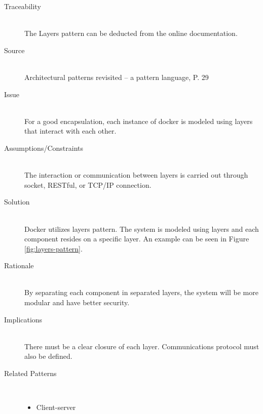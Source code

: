 \begin{description}
\item [Traceability]~\\
The Layers pattern can be deducted from the online documentation\cite{dockerarchi}.

\item [Source]~\\
Architectural patterns revisited -- a pattern language, P. 29 \cite{avgeriou2005architectural}

\item [Issue]~\\
For a good encapsulation, each instance of docker is modeled using layers that interact with each other.

\item [Assumptions/Constraints]~\\
The interaction or communication between layers is carried out through socket, RESTful, or TCP/IP connection.

\item [Solution]~\\
Docker utilizes layers pattern. The system is modeled using layers and each component resides on a specific layer. An example can be seen in Figure \ref{fig:layers-pattern}.

\item [Rationale] ~\\
By separating each component in separated layers, the system will be more modular and have better security.

\item [Implications]~\\
There must be a clear closure of each layer. Communications protocol must also be defined.

\item [Related Patterns]~\\
\begin{itemize}
	\item Client-server
\end{itemize}
\end{description}

\clearpage
